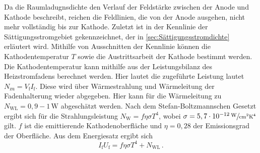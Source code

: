 Da die Raumladugnsdichte den Verlauf der Feldstärke zwischen der Anode und Kathode beschreibt, reichen die Feldlinien, die von der Anode ausgehen, nicht mehr vollständig bis zur Kathode.
Zuletzt ist in der Kennlinie der Sättigungsstromgebiet gekennzeichnet, der in \ref{sec:Sättigungsstromdichte} erläutert wird. Mithilfe von Ausschnitten der Kennlinie können die Kathodentemperatur $T$ sowie
die Austrittsarbeit der Kathode bestimmt werden.\\
Die Kathodentemperatur kann mithilfe aus der Leistungsbilanz des Heizstromfadens berechnet werden. Hier lautet die zugeführte Leistung lautet $N_{\text{zu}}=V_{\text{f}} I_{\text{f}}$.
Diese wird über Wärmestrahlung und Wärmeleitung der Fadenhalterung wieder abgegeben. Hier kann für die Wärmeleitung zu $N_{\text{WL}}=0,9 - 1\,\unit{\watt}$ abgeschätzt werden. Nach dem Stefan-Boltzmannschen Gesetzt ergibt sich für die
Strahlungsleistung $N_{\text{W}} = f\eta \sigma T^4$, wobei $\sigma = 5,7 \cdot 10^{-12}\,\sfrac{\unit{\watt}}{\unit{\centi\metre^2 \kelvin ^4}}$ gilt. $f$ ist die emittierende Kathodenoberfläche und $\eta =0,28$ der Emissionsgrad der Oberfläche.
Aus dem Energiesatz ergibt sich 
\begin{equation}
    I_{\text{f}}U_{\text{f}} = f \eta \sigma T^4 + N_{\text{WL}}\,.
    \label{eqn:aufWunschvonAmelie}
\end{equation}
